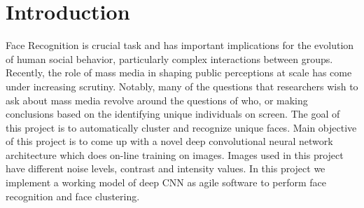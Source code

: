 \documentclass[a4paper,12pt, twoside]{NITKReport}
\begin{document}

\renewcommand{\chaptername}{CHAPTER}

\chapter{Introduction}
\label{chap1}

Face Recognition is crucial task and has important implications for the evolution of human social behavior, particularly complex interactions between groups. Recently, the role of mass media in shaping public perceptions at scale has come under increasing scrutiny. Notably, many of the questions that researchers wish to ask about mass media revolve around the questions of who, or making conclusions based on the identifying unique individuals on screen. The goal of this project is to automatically cluster and recognize unique faces. Main objective of this project is to come up with a novel deep convolutional neural network architecture which does on-line training on images. Images used in this project have different noise levels, contrast and intensity values. In this project we implement a working model of deep CNN as agile software to perform face recognition and face clustering. 
	
\end{document}
